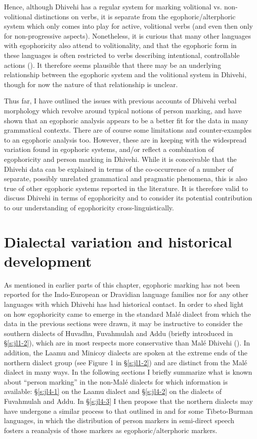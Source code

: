 \documentclass[output=paper]{langsci/langscibook}
\begin{document}
Hence, although Dhivehi has a regular system for marking volitional vs. non-volitional distinctions on verbs, it is separate from the egophoric/alterphoric system which only comes into play for active, volitional verbs (and even then only for non-progressive aspects). Nonetheless, it is curious that many other languages with egophoricity also attend to volitionality, and that the egophoric form in these languages is often restricted to verbs describing intentional, controllable actions (\citealt[14–15, 29–30]{SanRoque2018}). It therefore seems plausible that there may be an underlying relationship between the egophoric system and the volitional system in Dhivehi, though for now the nature of that relationship is unclear. 

   Thus far, I have outlined the issues with previous accounts of Dhivehi verbal morphology which revolve around typical notions of person marking, and have shown that an egophoric analysis appears to be a better fit for the data in many grammatical contexts. There are of course some limitations and counter-examples to an egophoric analysis too. However, these are in keeping with the widespread variation found in egophoric systems, and/or reflect a combination of egophoricity and person marking in Dhivehi. While it is conceivable that the Dhivehi data can be explained in terms of the co-occurrence of a number of separate, possibly unrelated grammatical and pragmatic phenomena, this is also true of other egophoric systems reported in the literature. It is therefore valid to discuss Dhivehi in terms of egophoricity and to consider its potential contribution to our understanding of egophoricity cross-linguistically.

\section{Dialectal variation and historical development}\label{s:jl4}

As mentioned in earlier parts of this chapter, egophoric marking has not been reported for the Indo-European or Dravidian language families nor for any other languages with which Dhivehi has had historical contact. In order to shed light on how egophoricity came to emerge in the standard Malé dialect from which the data in the previous sections were drawn, it may be instructive to consider the southern dialects of Huvadhu, Fuvahmulah and Addu (briefly introduced in §\ref{s:jl1-2}), which are in most respects more conservative than Malé Dhivehi (\citealt[13]{Fritz2002}). In addition, the Laamu and Minicoy dialects are spoken at the extreme ends of the northern dialect group (see Figure 1 in §\ref{s:jl1-2}) and are distinct from the Malé dialect in many ways. In the following sections I briefly summarize what is known about “person marking” in the non-Malé dialects for which information is available: §\ref{s:jl4-1} on the Laamu dialect and §\ref{s:jl4-2} on the dialects of Fuvahmulah and Addu. In §‎\ref{s:jl4-3} I then propose that the northern dialects may have undergone a similar process to that outlined in \cite{Widmer2015} and \cite{WidmerZemp2017} for some Tibeto-Burman languages, in which the distribution of person markers in semi-direct speech fosters a reanalysis of those markers as egophoric/alterphoric markers.
\end{document}
